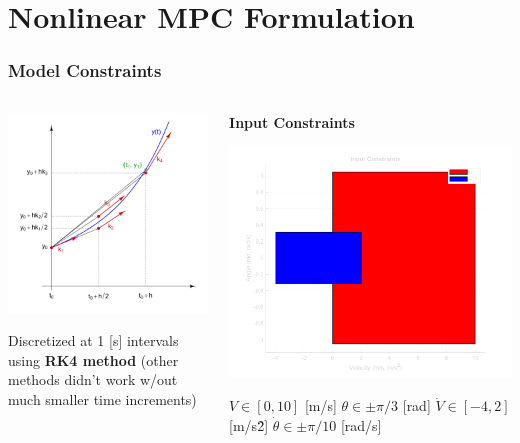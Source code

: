 \documentclass[aspectratio=169]{beamer}
\begin{document}
\section{Nonlinear MPC Formulation}
\begin{frame}
	\frametitle{Model Constraints}
	\begin{columns}
		\begin{column}{0.5\textwidth}
			\includegraphics[width=0.6\columnwidth]{figs/rk4_method.png}

			Discretized at 1 [s] intervals using \textbf{RK4 method} 
			(other methods didn't work w/out much smaller time increments) \cite{rk4}
		\end{column}
		\begin{column}{0.5\textwidth}
			\textbf{Input Constraints}

			\includegraphics[width=0.7\columnwidth]{figs/input_constraints.png}

			$V \in [0,10]$ [m/s]
			$\theta \in \pm \pi/3$ [rad]
			$\dot{V} \in [-4,2]$ [m/s\^2]
			$\dot{\theta} \in \pm \pi/10$ [rad/s]
		\end{column}
	\end{columns}
\end{frame}
\end{document}
